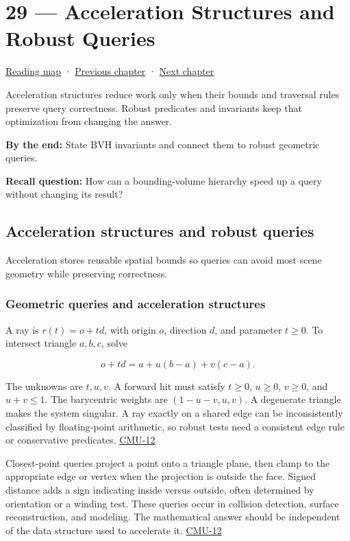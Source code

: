 \hypertarget{04-visual-computing-ii-ch029}{}
\section{29 --- Acceleration Structures and Robust Queries}\label{acceleration-structures-and-robust-queries}

\href{Chapter\%20Edition/02\%20-\%20Graphics\%20Vision\%20and\%20XR/00\%20-\%20Reading\%20Map}{Reading map} · \hyperref[04-visual-computing-ii-ch028]{Previous chapter} · \hyperref[04-visual-computing-ii-ch030]{Next chapter}

Acceleration structures reduce work only when their bounds and traversal rules preserve query correctness. Robust predicates and invariants keep that optimization from changing the answer.

\textbf{By the end:} State BVH invariants and connect them to robust geometric queries.

\textbf{Recall question:} How can a bounding-volume hierarchy speed up a query without changing its result?

\subsection{Acceleration structures and robust queries}\label{acceleration-structures-and-robust-queries-1}

Acceleration stores reusable spatial bounds so queries can avoid most scene geometry while preserving correctness.

\subsubsection{Geometric queries and acceleration structures}\label{geometric-queries-and-acceleration-structures}

A ray is \(r(t)=o+td\), with origin \(o\), direction \(d\), and parameter \(t\ge0\). To intersect triangle \(a,b,c\), solve

\[
o+td=a+u(b-a)+v(c-a).
\]

The unknowns are \(t,u,v\). A forward hit must satisfy \(t\ge0\), \(u\ge0\), \(v\ge0\), and \(u+v\le1\). The barycentric weights are \((1-u-v,u,v)\). A degenerate triangle makes the system singular. A ray exactly on a shared edge can be inconsistently classified by floating-point arithmetic, so robust tests need a consistent edge rule or conservative predicates. \hyperref[04-visual-computing-ii-ch036]{CMU-12}

Closest-point queries project a point onto a triangle plane, then clamp to the appropriate edge or vertex when the projection is outside the face. Signed distance adds a sign indicating inside versus outside, often determined by orientation or a winding test. These queries occur in collision detection, surface reconstruction, and modeling. The mathematical answer should be independent of the data structure used to accelerate it. \hyperref[04-visual-computing-ii-ch036]{CMU-12}

